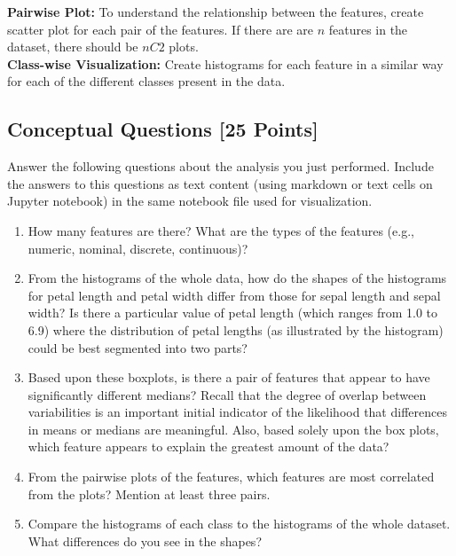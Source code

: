 \documentclass[letter-paper,12pt]{article} %
\begin{document}
\textbf{Pairwise Plot:} To understand the relationship between the features, create scatter plot for each pair of the features. If there are are $n$ features in the dataset, there should be $nC2$ plots.\\

\textbf{Class-wise Visualization:} Create histograms for each feature in a similar way for each of the different classes present in the data. \\

\subsection{Conceptual Questions [25 Points]}
Answer the following questions about the analysis you just performed. Include the answers to this questions as text content (using markdown or text cells on Jupyter notebook) in the same notebook file used for visualization.

\begin{enumerate}
    \item How many features are there? What are the types of the features (e.g., numeric, nominal, discrete, continuous)?
    
    \item From the histograms of the whole data, how do the shapes of the histograms for petal length and petal width differ from those for sepal length and sepal width? Is there a particular value of petal length (which ranges from 1.0 to 6.9) where the distribution of petal lengths (as illustrated by the histogram) could be best segmented into two parts?
    
    \item Based upon these boxplots, is there a pair of features that appear to have significantly different medians? Recall that the degree of overlap between variabilities is an important initial indicator of the likelihood that differences in means or medians are meaningful. Also, based solely upon the box plots, which feature appears to explain the greatest amount of the data?
    
    \item From the pairwise plots of the features, which features are most correlated from the plots? Mention at least three pairs. 
    
    \item Compare the histograms of each class to the histograms of the whole dataset. What differences do you see in the shapes? 
    
\end{enumerate}
\end{document}
